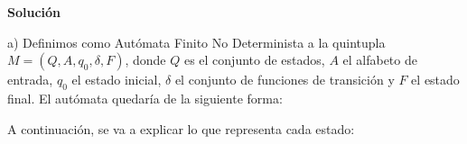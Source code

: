 \documentclass[11pt,a4paper]{article}
\newcommand{\sol}{\textbf{Solución}}
\begin{document}
		\sol \par
		
		a) Definimos como Autómata Finito No Determinista a la quintupla $M = (Q, A, q_0, \delta, F)$, donde $Q$ es
		el conjunto de estados, $A$ el alfabeto de entrada, $q_0$ el estado inicial, $\delta$ el conjunto de funciones
		de transición y $F$ el estado final. El autómata quedaría de la siguiente forma:
		
		\begin{center}
		\end{center}
		
		A continuación, se va a explicar lo que representa cada estado:
		
\end{document}
